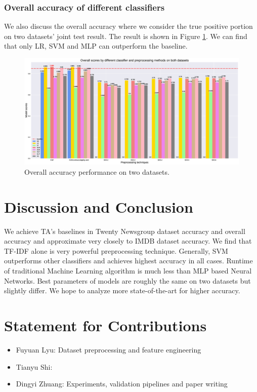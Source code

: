 \documentclass[11pt]{scrartcl}
\begin{document}
\subsubsection*{Overall accuracy of different classifiers}
We also discuss the overall accuracy where we consider the true positive portion on two datasets' joint test result. The result is shown in Figure \ref{overall_accuracy}. We can find that only LR, SVM and MLP can outperform the baseline.

\begin{figure}[H]
	\centering
	\includegraphics[width=0.9 \linewidth]{fig/model_acc_overall.eps}
	\caption{Overall accuracy performance on two datasets.}
	\label{overall_accuracy}
\end{figure}



\section{Discussion and Conclusion}
We achieve TA's baselines in Twenty Newsgroup dataset accuracy and overall accuracy and approximate very closely to IMDB dataset accuracy. We find that TF-IDF alone is very powerful preprocessing technique. Generally, SVM outperforms other classifiers and achieves highest accuracy in all cases. Runtime of traditional Machine Learning algorithm is much less than MLP based Neural Networks. Best parameters of models are roughly the same on two datasets but slightly differ. We hope to analyze more state-of-the-art for higher accuracy.

\section{Statement for Contributions}
\begin{itemize}
	\item Fuyuan Lyu: Dataset preprocessing and feature engineering
	\item Tianyu Shi:
	\item Dingyi Zhuang: Experiments, validation pipelines and paper writing
\end{itemize}

\newpage


\end{document}
